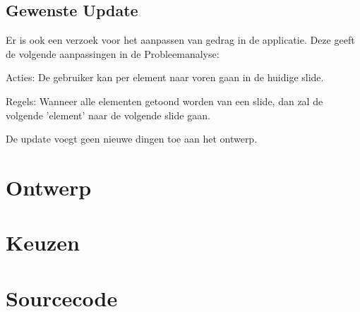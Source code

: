 \documentclass[a4paper]{article}
\begin{document}
\subsection{Gewenste Update}
Er is ook een verzoek voor het aanpassen van gedrag in de applicatie. Deze geeft
de volgende aanpassingen in de Probleemanalyse:

Acties: De gebruiker kan per element naar voren gaan in de huidige slide.

Regels: Wanneer alle elementen getoond worden van een slide, dan zal de volgende
'element' naar de volgende slide gaan.

De update voegt geen nieuwe dingen toe aan het ontwerp.

\section{Ontwerp}


\section{Keuzen}



\section{Sourcecode}
\end{document}
